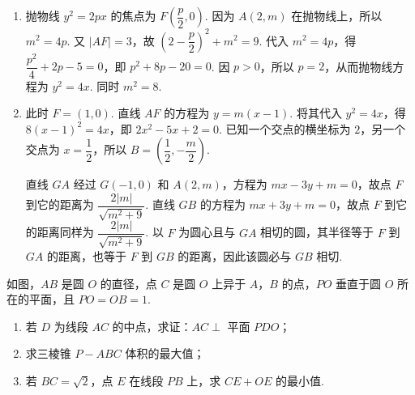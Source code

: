\begin{solution}
\begin{enumerate}
\item 抛物线 \(y^2=2px\) 的焦点为 \(F\left(\dfrac p2,0\right)\). 因为 \(A(2,m)\) 在抛物线上，所以 \(m^2=4p\). 又 \(|AF|=3\)，故
\(\left(2-\dfrac p2\right)^2+m^2=9\). 代入 \(m^2=4p\)，得 \(\dfrac{p^2}{4}+2p-5=0\)，即 \(p^2+8p-20=0\). 因 \(p>0\)，所以 \(p=2\)，从而抛物线方程为 \(y^2=4x\). 同时 \(m^2=8\).
\item 此时 \(F=(1,0)\). 直线 \(AF\) 的方程为 \(y=m(x-1)\). 将其代入 \(y^2=4x\)，得 \(8(x-1)^2=4x\)，即 \(2x^2-5x+2=0\). 已知一个交点的横坐标为 \(2\)，另一个交点为 \(x=\dfrac12\)，所以 \(B=\left(\dfrac12,-\dfrac m2\right)\).

直线 \(GA\) 经过 \(G(-1,0)\) 和 \(A(2,m)\)，方程为 \(mx-3y+m=0\)，故点 \(F\) 到它的距离为 \(\dfrac{2|m|}{\sqrt{m^2+9}}\). 直线 \(GB\) 的方程为 \(mx+3y+m=0\)，故点 \(F\) 到它的距离同样为 \(\dfrac{2|m|}{\sqrt{m^2+9}}\). 以 \(F\) 为圆心且与 \(GA\) 相切的圆，其半径等于 \(F\) 到 \(GA\) 的距离，也等于 \(F\) 到 \(GB\) 的距离，因此该圆必与 \(GB\) 相切.
\end{enumerate}
\end{solution}

\begin{problem}
如图，\(AB\) 是圆 \(O\) 的直径，点 \(C\) 是圆 \(O\) 上异于 \(A\)，\(B\) 的点，\(PO\) 垂直于圆 \(O\) 所在的平面，且 \(PO = OB = 1\).

\begin{enumerate}
\item 若 \(D\) 为线段 \(AC\) 的中点，求证：\(AC \perp\) 平面 \(PDO\)；
\item 求三棱锥 \(P - ABC\) 体积的最大值；
\item 若 \(BC = \sqrt{2}\)，点 \(E\) 在线段 \(PB\) 上，求 \(CE + OE\) 的最小值.
\end{enumerate}

\end{problem}

